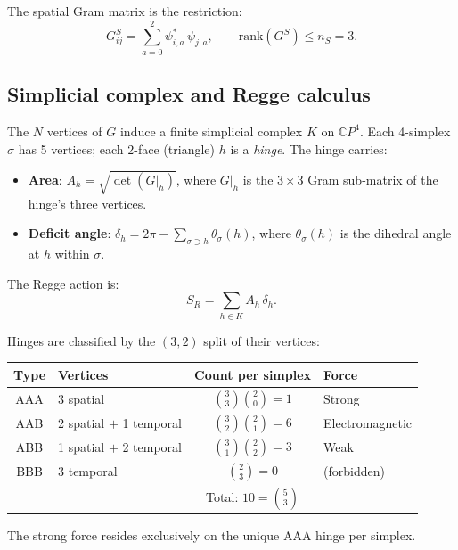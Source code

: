 \documentclass[12pt]{article}
\theoremstyle{remark}
\begin{document}
The spatial Gram matrix is the restriction:
\begin{equation}
G^S_{ij} = \sum_{a=0}^{2} \psi^*_{i,a}\, \psi_{j,a}, \qquad
\mathrm{rank}(G^S) \leq n_S = 3.
\label{eq:GS}
\end{equation}

\subsection{Simplicial complex and Regge calculus}

The $N$ vertices of $G$ induce a finite simplicial complex $K$ on
$\mathbb{C}P^4$. Each 4-simplex $\sigma$ has 5 vertices; each 2-face
(triangle) $h$ is a \emph{hinge}. The hinge carries:

\begin{itemize}
\item \textbf{Area}: $A_h = \sqrt{\det(G|_h)}$, where $G|_h$ is the
  $3 \times 3$ Gram sub-matrix of the hinge's three vertices.
\item \textbf{Deficit angle}: $\delta_h = 2\pi -
  \sum_{\sigma \supset h} \theta_\sigma(h)$, where $\theta_\sigma(h)$
  is the dihedral angle at $h$ within $\sigma$.
\end{itemize}

\noindent
The Regge action \cite{Regge} is:
\begin{equation}
\boxed{S_R = \sum_{h \in K} A_h\, \delta_h.}
\label{eq:Regge}
\end{equation}

Hinges are classified by the $(3,2)$ split of their vertices:

\begin{center}
\begin{tabular}{clcl}
\hline
Type & Vertices & Count per simplex & Force \\
\hline
AAA & 3 spatial & $\binom{3}{3}\binom{2}{0} = 1$ & Strong \\
AAB & 2 spatial $+$ 1 temporal & $\binom{3}{2}\binom{2}{1} = 6$ &
  Electromagnetic \\
ABB & 1 spatial $+$ 2 temporal & $\binom{3}{1}\binom{2}{2} = 3$ &
  Weak \\
BBB & 3 temporal & $\binom{2}{3} = 0$ & (forbidden) \\
\hline
& & Total: $10 = \binom{5}{3}$ & \\
\hline
\end{tabular}
\end{center}

\noindent
The strong force resides exclusively on the unique AAA hinge per simplex.
\end{document}
